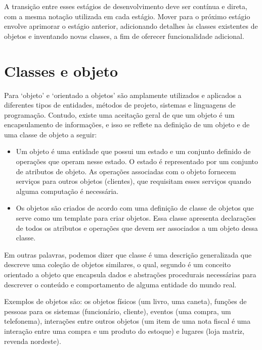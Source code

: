 A transição entre esses estágios de desenvolvimento deve ser contínua e direta,
com a mesma notação utilizada em cada estágio. Mover para o próximo estágio
envolve aprimorar o estágio anterior, adicionando detalhes às classes
existentes de objetos e inventando novas classes, a fim de oferecer
funcionalidade adicional.

\section{Classes e objeto}

Para \cite{sommerville2003engenharia} ‘objeto’ e ‘orientado a objetos’ são
amplamente utilizados e aplicados a diferentes tipos de entidades, métodos de
projeto, sistemas e linguagens de programação. Contudo, existe uma aceitação
geral de que um objeto é um encapsulamento de informações, e isso se reflete na
definição de um objeto e de uma classe de objeto a seguir:

\begin{itemize}
  \item Um objeto é uma entidade que possui um estado e um conjunto definido de
  operações que operam nesse estado. O estado é representado por um conjunto de
  atributos de objeto. As operações associadas com o objeto fornecem serviços para outros objetos (clientes), que requisitam esses serviços quando alguma computação é necessária.

  \item Os objetos são criados de acordo com uma definição de classe de objetos 
  que serve como um template para criar objetos. Essa classe apresenta 
  declarações de todos os atributos e operações que devem ser associados a um 
  objeto dessa classe.
\end{itemize}

Em outras palavras, podemos dizer que classe é uma descrição generalizada que
descreve uma coleção de objetos similares, o qual, segundo 
 é um conceito orientado a objeto que 
encapsula dados e abstrações procedurais necessárias para descrever o conteúdo 
e comportamento de alguma entidade do mundo real.

Exemplos de objetos são: os objetos físicos (um livro, uma caneta), funções 
de pessoas para os sistemas (funcionário, cliente), eventos (uma compra, um 
telefonema), interações entre outros objetos (um item de uma nota fiscal é uma 
interação entre uma compra e um produto do estoque) e lugares (loja matriz, 
revenda nordeste).

